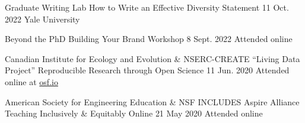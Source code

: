 \begin{cventries}
  \cventry
    {Graduate Writing Lab} %
    {How to Write an Effective Diversity Statement} %
    {11 Oct. 2022} %
    {Yale University} %
    {
    }

  \cventry
    {Beyond the PhD} %
    {Building Your Brand Workshop} %
    {8 Sept. 2022} %
    {Attended online} %
    {
    }


  \cventry
    {Canadian Institute for Ecology and Evolution \& NSERC-CREATE ``Living Data Project''} %
    {Reproducible Research through Open Science} %
    {11 Jun. 2020} %
    {Attended online at \href{https://osf.io/p7r5d/}{osf.io}} %
    {
    }

  \cventry
    {American Society for Engineering Education \& NSF INCLUDES Aspire Alliance} %
    {Teaching Inclusively \& Equitably Online} %
    {21 May 2020} %
    {Attended online} %
    {
    }


\end{cventries}
